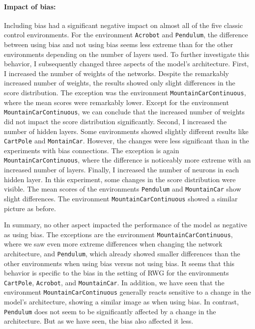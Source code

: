 \paragraph*{Impact of bias:} Including bias had a significant negative impact on almost all of the five classic control environments. For the environment \verb|Acrobot| and \verb|Pendulum|, the difference between using bias and not using bias seems less extreme than for the other environments depending on the number of layers used. To further investigate this behavior, I subsequently changed three aspects of the model's architecture. First, I increased the number of weights of the networks. Despite the remarkably increased number of weights, the results showed only slight differences in the score distribution. The exception was the environment \verb|MountainCarContinuous|, where the mean scores were remarkably lower. Except for the environment \verb|MountainCarContinuous|, we can conclude that the increased number of weights did not impact the score distribution significantly. Second, I increased the number of hidden layers. Some environments showed slightly different results like \verb|CartPole| and \verb|MontainCar|. However, the changes were less significant than in the experiments with bias connections. The exception is again \verb|MountainCarContinuous|, where the difference is noticeably more extreme with an increased number of layers. Finally, I increased the number of neurons in each hidden layer. In this experiment, some changes in the score distribution were visible. The mean scores of the environments \verb|Pendulum| and \verb|MountainCar| show slight differences. The environment \verb|MountainCarContinuous| showed a similar picture as before.

In summary, no other aspect impacted the performance of the model as negative as using bias. The exceptions are the environment \verb|MountainCarContinuous|, where we saw even more extreme differences when changing the network architecture, and \verb|Pendulum|, which already showed smaller differences than the other environments when using bias versus not using bias. It seems that this behavior is specific to the bias in the setting of RWG for the environments \verb|CartPole|, \verb|Acrobot|, and \verb|MountainCar|. In addition, we have seen that the environment \verb|MountainCarContinuous| generally reacts sensitive to a change in the model's architecture, showing a similar image as when using bias. In contrast, \verb|Pendulum| does not seem to be significantly affected by a change in the architecture. But as we have seen, the bias also affected it less.

